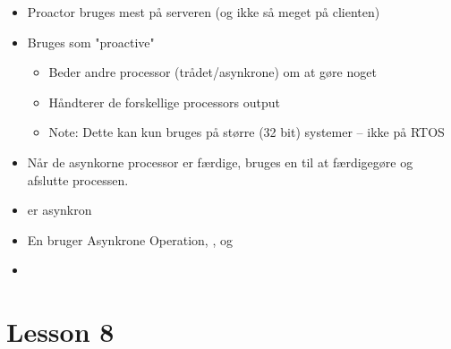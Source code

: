 \documentclass[oneside, 10pt]{memoir}
\begin{document}
\begin{itemize}
	\item Proactor bruges mest på serveren (og ikke så meget på clienten)
	
	\item Bruges som "proactive" 
	\begin{itemize}
		\item Beder andre processor (trådet/asynkrone) om at gøre noget
		\item Håndterer de forskellige processors output
		\item Note: Dette kan kun bruges på større (32 bit) systemer -- ikke på RTOS
	\end{itemize}

	\item Når de asynkorne processor er færdige, bruges en  til at færdigegøre og afslutte processen.

	\item {} er asynkron

	\item En  bruger Asynkrone Operation, ,  og 

	\item 
\end{itemize}





\newpage
\section*{Lesson 8}
\end{document}
